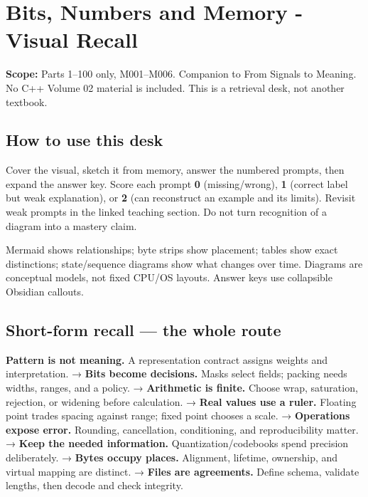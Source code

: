 \hypertarget{appendix-ef4d27797a92}{}\label{referencestart:appendix-ef4d27797a92}
\section{Bits, Numbers and Memory - Visual Recall}\label{appendix-ef4d27797a92-bits-numbers-and-memory---visual-recall}

\hypertarget{appendix-ef4d27797a92-bits-numbers-and-memory---visual-recall}{}

\textbf{Scope:} Parts 1--100 only, M001--M006. Companion to {From Signals to Meaning}. No C++ Volume 02 material is included. This is a retrieval desk, not another textbook.

\subsection{How to use this desk}\label{appendix-ef4d27797a92-how-to-use-this-desk}

\hypertarget{appendix-ef4d27797a92-how-to-use-this-desk}{}

Cover the visual, sketch it from memory, answer the numbered prompts, then expand the answer key. Score each prompt \textbf{0} (missing/wrong), \textbf{1} (correct label but weak explanation), or \textbf{2} (can reconstruct an example and its limits). Revisit weak prompts in the linked teaching section. Do not turn recognition of a diagram into a mastery claim.

Mermaid shows relationships; byte strips show placement; tables show exact distinctions; state/sequence diagrams show what changes over time. Diagrams are conceptual models, not fixed CPU/OS layouts. Answer keys use collapsible Obsidian callouts.

\subsection{Short-form recall --- the whole route}\label{appendix-ef4d27797a92-short-form-recall-the-whole-route}

\hypertarget{appendix-ef4d27797a92-short-form-recall-the-whole-route}{}

\textbf{Pattern is not meaning.} A representation contract assigns weights and interpretation. → \textbf{Bits become decisions.} Masks select fields; packing needs widths, ranges, and a policy. → \textbf{Arithmetic is finite.} Choose wrap, saturation, rejection, or widening before calculation. → \textbf{Real values use a ruler.} Floating point trades spacing against range; fixed point chooses a scale. → \textbf{Operations expose error.} Rounding, cancellation, conditioning, and reproducibility matter. → \textbf{Keep the needed information.} Quantization/codebooks spend precision deliberately. → \textbf{Bytes occupy places.} Alignment, lifetime, ownership, and virtual mapping are distinct. → \textbf{Files are agreements.} Define schema, validate lengths, then decode and check integrity.

